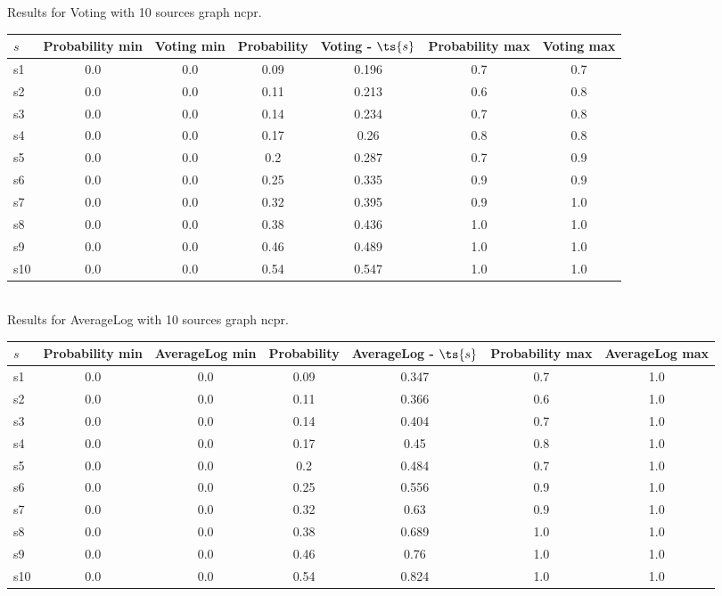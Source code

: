 \documentclass{article}
\begin{document}
\noindent Results for Voting with 10 sources graph ncpr.

\noindent\begin{tabular}{|l|c|c|c|c|c|c|}
\hline
$s$& Probability min & Voting min & Probability & Voting - $\ts{s}$ & Probability max & Voting max\\
\hline
s1 &0.0 & 0.0 & 0.09 & 0.196 & 0.7 & 0.7\\
\hline
s2 &0.0 & 0.0 & 0.11 & 0.213 & 0.6 & 0.8\\
\hline
s3 &0.0 & 0.0 & 0.14 & 0.234 & 0.7 & 0.8\\
\hline
s4 &0.0 & 0.0 & 0.17 & 0.26 & 0.8 & 0.8\\
\hline
s5 &0.0 & 0.0 & 0.2 & 0.287 & 0.7 & 0.9\\
\hline
s6 &0.0 & 0.0 & 0.25 & 0.335 & 0.9 & 0.9\\
\hline
s7 &0.0 & 0.0 & 0.32 & 0.395 & 0.9 & 1.0\\
\hline
s8 &0.0 & 0.0 & 0.38 & 0.436 & 1.0 & 1.0\\
\hline
s9 &0.0 & 0.0 & 0.46 & 0.489 & 1.0 & 1.0\\
\hline
s10 &0.0 & 0.0 & 0.54 & 0.547 & 1.0 & 1.0\\
\hline
\end{tabular}\\

\noindent Results for AverageLog with 10 sources graph ncpr.

\noindent\begin{tabular}{|l|c|c|c|c|c|c|}
\hline
$s$& Probability min & AverageLog min & Probability & AverageLog - $\ts{s}$ & Probability max & AverageLog max\\
\hline
s1 &0.0 & 0.0 & 0.09 & 0.347 & 0.7 & 1.0\\
\hline
s2 &0.0 & 0.0 & 0.11 & 0.366 & 0.6 & 1.0\\
\hline
s3 &0.0 & 0.0 & 0.14 & 0.404 & 0.7 & 1.0\\
\hline
s4 &0.0 & 0.0 & 0.17 & 0.45 & 0.8 & 1.0\\
\hline
s5 &0.0 & 0.0 & 0.2 & 0.484 & 0.7 & 1.0\\
\hline
s6 &0.0 & 0.0 & 0.25 & 0.556 & 0.9 & 1.0\\
\hline
s7 &0.0 & 0.0 & 0.32 & 0.63 & 0.9 & 1.0\\
\hline
s8 &0.0 & 0.0 & 0.38 & 0.689 & 1.0 & 1.0\\
\hline
s9 &0.0 & 0.0 & 0.46 & 0.76 & 1.0 & 1.0\\
\hline
s10 &0.0 & 0.0 & 0.54 & 0.824 & 1.0 & 1.0\\
\hline
\end{tabular}\\
\end{document}
